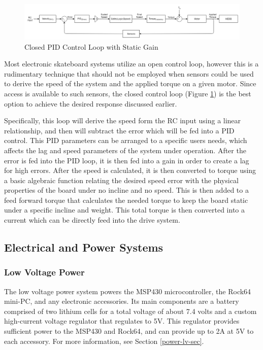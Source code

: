 \documentclass[titlepage, letterpaper,12pt]{article}
\begin{document}
\begin{figure}[!htbp]\centering
\includegraphics[width=\textwidth,height=\textheight,keepaspectratio]{ControlFigs/ClosedLoop.png}
\caption{Closed PID Control Loop with Static Gain}
\label{ClosedPP}
\end{figure}

Most electronic skateboard systems utilize an open control loop, however this is a rudimentary technique that should not be employed when sensors could be used to derive the speed of the system and the applied torque on a given motor. Since access is available to such sensors, the closed control loop (Figure \ref{ClosedPP}) is the best option to achieve the desired response discussed earlier.

Specifically, this loop will derive the speed form the RC input using a linear relationship, and then will subtract the error which will be fed into a PID control. This PID parameters can be arranged to a specific users needs, which affects the lag and speed parameters of the system under operation. After the error is fed into the PID loop, it is then fed into a gain in order to create a lag for high errors. After the speed is calculated, it is then converted to torque using a basic algebraic function relating the desired speed error with the physical properties of the board under no incline and no speed. This is then added to a feed forward torque that calculates the needed torque to keep the board static under a specific incline and weight. This total torque is then converted into a current which can be directly feed into the drive system.

\subsection{Electrical and Power Systems}
\subsubsection{Low Voltage Power}
The low voltage power system powers the MSP430 microcontroller, the Rock64 mini-PC, and any electronic accessories. Its main components are a battery comprised of two lithium cells for a total voltage of about 7.4 volts and a custom high-current voltage regulator that regulates to 5V. This regulator provides sufficient power to the MSP430 and Rock64, and can provide up to 2A at 5V to each accessory. For more information, see Section \ref{power-lv-sec}.
\end{document}
